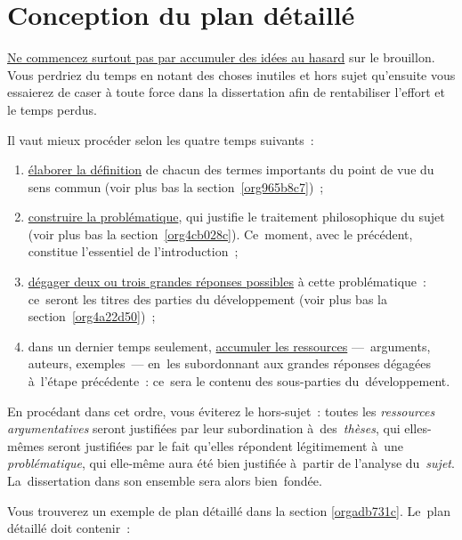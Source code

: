 \documentclass[a4paper,12pt]{report}
\begin{document}
\chapter{Conception du plan détaillé}
\label{sec:org43c1898}

\uline{Ne commencez surtout pas par accumuler des idées au hasard} sur le
brouillon. Vous perdriez du temps en notant des choses inutiles et hors
sujet qu'ensuite vous essaierez de caser à toute force dans la
dissertation afin de rentabiliser l'effort et le temps perdus.

Il vaut mieux procéder selon les quatre temps suivants :

\begin{enumerate}
\item \uline{élaborer la définition} de chacun des termes importants du point de
vue du sens commun (voir plus bas la section \ref{org965b8c7}) ;

\item \uline{construire la problématique}, qui justifie le traitement
philosophique du sujet (voir plus bas la section \ref{org4cb028c}).
Ce moment, avec le précédent, constitue l'essentiel de
l'introduction ;

\item \uline{dégager deux ou trois grandes réponses possibles} à cette
problématique : ce seront les titres des parties du développement
(voir plus bas la section \ref{org4a22d50}) ;

\item dans un dernier temps seulement, \uline{accumuler les ressources}
--- arguments, auteurs, exemples --- en les subordonnant aux grandes
réponses dégagées à l'étape précédente : ce sera le contenu des
sous-parties du développement.
\end{enumerate}

En procédant dans cet ordre, vous éviterez le hors-sujet : toutes les
\emph{ressources argumentatives} seront justifiées par leur subordination
à des \emph{thèses}, qui elles-mêmes seront justifiées par le fait qu'elles
répondent légitimement à une \emph{problématique}, qui elle-même aura été
bien justifiée à partir de l'analyse du \emph{sujet}. La dissertation dans
son ensemble sera alors bien fondée.

Vous trouverez un exemple de plan détaillé dans la section \ref{orgadb731c}.
Le plan détaillé doit contenir :
\end{document}
